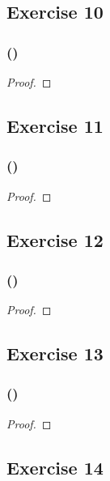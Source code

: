 \documentclass[14pt]{extarticle}
\begin{document}
\subsection{Exercise 10}

\subsubsection{()}

\begin{proof}

\end{proof}

\subsection{Exercise 11}

\subsubsection{()}

\begin{proof}

\end{proof}

\subsection{Exercise 12}

\subsubsection{()}

\begin{proof}

\end{proof}

\subsection{Exercise 13}

\subsubsection{()}

\begin{proof}

\end{proof}

\subsection{Exercise 14}
\end{document}
